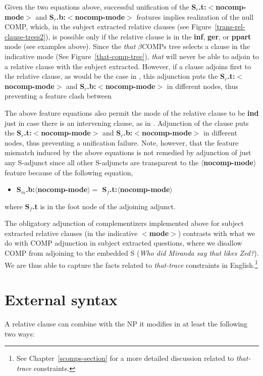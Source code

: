 Given the two equations above, successful unification of the {\bf
S$_r$.t:$<$nocomp-mode$>$} and {\bf S$_r$.b:$<$nocomp-mode$>$} features
implies realization of the null COMP, which, in the subject extracted
relative clauses (see Figure~\ref{trans-rel-clause-trees2}), is possible
only if the relative clause is in the {\bf inf}, {\bf ger}, or {\bf ppart}
mode (see examples above). Since the {\it that} $\beta$COMPs tree selects a
clause in the indicative mode (See Figure~\ref{that-comp-tree}), {\it that}
will never be able to adjoin to a relative clause with the subject
extracted. However, if a clause adjoins first to the relative clause, as
would be the case in , this adjunction puts the {\bf
S$_r$.t:$<$nocomp-mode$>$} and {\bf S$_r$.b:$<$nocomp-mode$>$} in different
nodes, thus preventing a feature clash between

The above feature equations also permit the mode of the relative clause to
be {\bf ind} just in case there is an intervening clause, as in
. Adjunction of the clause puts the {\bf S$_r$.t:$<$nocomp-mode$>$}
and {\bf S$_r$.b:$<$nocomp-mode$>$} in different nodes, thus preventing a
unification failure. Note, however, that the feature mismatch induced by
the above equations is not remedied by adjunction of just any S-adjunct
since all other S-adjuncts are transparent to the {\bf
$\langle$nocomp-mode$\rangle$} feature because of the following equation,

\begin{itemize}
\item {\bf S$_{m}$.b:$\langle$nocomp-mode$\rangle =$
S$_{f}$.t:$\langle$nocomp-mode$\rangle$}
\end{itemize}

where {\bf S$_{f}$.t} is in the foot node of the adjoining adjunct.


The obligatory adjunction of complementizers implemented above for subject
extracted relative clauses (in the indicative {\bf $<$mode$>$}) contrasts
with what we do with COMP adjunction in subject extracted questions, where
we disallow COMP from adjoining to the embedded S ({\it *Who did Miranda
say that likes Zed?}). We are thus able to capture the facts related to
{\it that-trace} constraints in English.\footnote{%
%
See Chapter~\ref{scomps-section} for a more detailed discussion related to
{\it that-trace} constraints.%
%
}

\section{External syntax}
A relative clause can combine with the NP it modifies in at least 
the following two ways:

